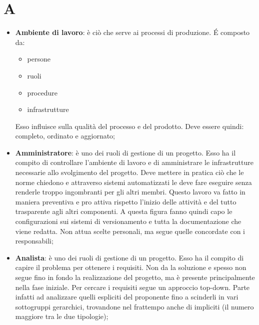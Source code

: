 % 
%
%
%

\section{A}

\begin{itemize}
	\item \textbf{Ambiente di lavoro}: è ciò che serve ai processi di produzione. \'E composto da:
		\begin{itemize}
			\item persone
			\item ruoli
			\item procedure
			\item infrastrutture
		\end{itemize}
		\noindent
		Esso influisce sulla qualità del processo e del prodotto. Deve essere quindi: completo, ordinato e aggiornato;

	\item \textbf{Amministratore}: è uno dei ruoli di gestione di un progetto.
Esso ha il compito di controllare l'ambiente di lavoro e di amministrare le infrastrutture necessarie allo svolgimento del progetto. \newline
Deve mettere in pratica ciò che le norme chiedono e attraverso sistemi automatizzati le deve fare eseguire senza renderle troppo ingombranti per gli altri membri. Questo lavoro va fatto in maniera preventiva e pro attiva rispetto l'inizio delle attività e del tutto trasparente agli altri componenti. \newline
A questa figura fanno quindi capo le configurazioni sui sistemi di versionamento e tutta la documentazione che viene redatta. Non attua scelte personali, ma segue quelle concordate con i responsabili;
	\item \textbf{Analista}: è uno dei ruoli di gestione di un progetto.
Esso ha il compito di capire il problema per ottenere i requisiti. Non da la soluzione e spesso non segue fino in fondo la realizzazione del progetto, ma è presente principalmente nella fase iniziale. \newline
Per cercare i requisiti segue un approccio top-down. Parte infatti ad analizzare quelli espliciti del proponente fino a scinderli in vari sottogruppi gerarchici, trovandone nel frattempo anche di impliciti (il numero maggiore tra le due tipologie);


\end{itemize}
